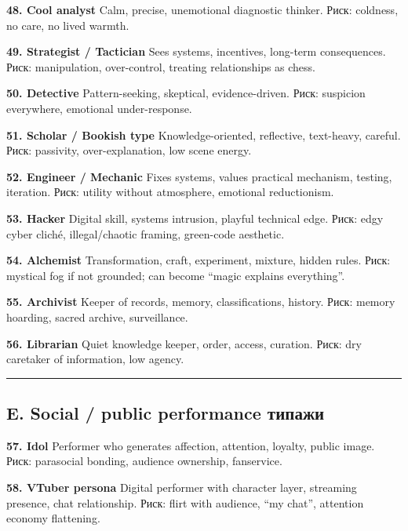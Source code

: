 \textbf{48. Cool analyst} Calm, precise, unemotional diagnostic thinker.
Риск: coldness, no care, no lived warmth.

\textbf{49. Strategist /\hspace{0pt} Tactician} Sees systems, incentives, long-term
consequences. Риск: manipulation, over-control, treating relationships
as chess.

\textbf{50. Detective} Pattern-seeking, skeptical, evidence-driven.
Риск: suspicion everywhere, emotional under-response.

\textbf{51. Scholar /\hspace{0pt} Bookish type} Knowledge-oriented, reflective,
text-heavy, careful. Риск: passivity, over-explanation, low scene
energy.

\textbf{52. Engineer /\hspace{0pt} Mechanic} Fixes systems, values practical
mechanism, testing, iteration. Риск: utility without atmosphere,
emotional reductionism.

\textbf{53. Hacker} Digital skill, systems intrusion, playful technical
edge. Риск: edgy cyber cliché, illegal/\hspace{0pt}chaotic framing, green-code
aesthetic.

\textbf{54. Alchemist} Transformation, craft, experiment, mixture,
hidden rules. Риск: mystical fog if not grounded; can become ``magic
explains everything''.

\textbf{55. Archivist} Keeper of records, memory, classifications,
history. Риск: memory hoarding, sacred archive, surveillance.

\textbf{56. Librarian} Quiet knowledge keeper, order, access, curation.
Риск: dry caretaker of information, low agency.

\begin{center}\rule{0.5\linewidth}{0.5pt}\end{center}

\subsection*{E. Social /\hspace{0pt} public performance типажи}

\textbf{57. Idol} Performer who generates affection, attention, loyalty,
public image. Риск: parasocial bonding, audience ownership, fanservice.

\textbf{58. VTuber persona} Digital performer with character layer,
streaming presence, chat relationship. Риск: flirt with audience, ``my
chat'', attention economy flattening.

